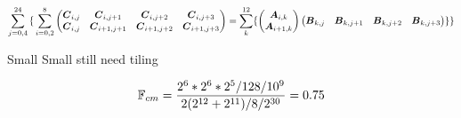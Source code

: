 \documentclass[conference]{IEEEtran}
\begin{document}
{\small \begin{equation*}
    \sum_{j=0,4}^{24}
    { \{ } \sum_{i=0,2}^8 
  \begin{pmatrix}
    {\boldsymbol C}_{i,j}  & {\boldsymbol C}_{i,j+1}    & {\boldsymbol C}_{i,j+2}    &{\boldsymbol C}_{i,j+3} \\
    {\boldsymbol C}_{i,j}  & {\boldsymbol C}_{i+1,j+1}   & {\boldsymbol C}_{i+1,j+2}  & {\boldsymbol C}_{i+1,j+3} \\
  \end{pmatrix}    = \sum_k^{12}
  \{
  \begin{pmatrix}
    {\boldsymbol A}_{i,k}  \\
    {\boldsymbol A}_{i+1,k}   \\
  \end{pmatrix}  
  \begin{pmatrix}
    {\boldsymbol B}_{k,j}  &  {\boldsymbol B}_{k,j+1}  & {\boldsymbol B}_{k,j+2}  &{\boldsymbol B}_{k,j+3} \\
  \end{pmatrix}
  \}{ \}}    
\end{equation*}
}
\begin{algorithm}
  \caption{Small Small still need tiling}
  \label{alg:one3}
  \begin{algorithmic}[1]
      \ENDFOR
    \ENDFOR
  \end{algorithmic}  
\end{algorithm}

\[
\mathbb{F}_{cm} = \frac{2^6 * 2^6 * 2^5/128/10^9 } {2(2^{12}+2^{11})/8/2^{30}}=  0.75  
\]
\end{document}
